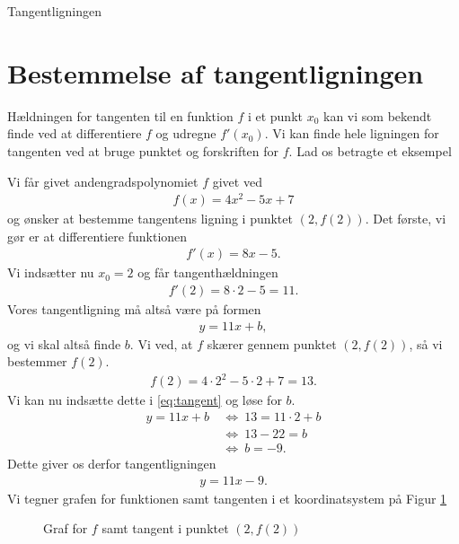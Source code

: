 \begin{center}
	\Huge
	Tangentligningen 
\end{center}

\section*{Bestemmelse af tangentligningen}

Hældningen for tangenten til en funktion $f$ i et punkt $x_0$ kan vi som bekendt finde ved at differentiere $f$
og udregne $f'(x_0)$. Vi kan finde hele ligningen for tangenten ved at bruge punktet og forskriften for $f$. Lad os betragte et eksempel
\begin{exa}
	Vi får givet andengradspolynomiet $f$ givet ved
	\begin{align*}
		f(x) = 4x^2-5x+7
	\end{align*}
	og ønsker at bestemme tangentens ligning i punktet $(2,f(2))$. Det første, vi gør er at differentiere 
	funktionen
	\begin{align*}
		f'(x) = 8x - 5.
	\end{align*}
	Vi indsætter nu $x_0 = 2$ og får tangenthældningen
	\begin{align*}
		f'(2) = 8\cdot 2 - 5 = 11.
	\end{align*}
	Vores tangentligning må altså være på formen
	\begin{align}\label{eq:tangent}
		y = 11x + b,
	\end{align}
	og vi skal altså finde $b$. Vi ved, at $f$ skærer gennem punktet $(2,f(2))$, så vi bestemmer $f(2)$.
	\begin{align*}
		f(2) = 4\cdot 2^2-5\cdot 2 + 7 = 13.
	\end{align*}
	Vi kan nu indsætte dette i \eqref{eq:tangent} og løse for $b$.
	\begin{align*}
		y = 11x + b \ &\Leftrightarrow \ 13 = 11\cdot 2 + b \\
		&\Leftrightarrow	 \ 13 - 22 = b \\
		&\Leftrightarrow	 \ b = -9.
	\end{align*}
	Dette giver os derfor tangentligningen 
	\begin{align*}
		y = 11x-9.
	\end{align*}
	Vi tegner grafen for funktionen samt tangenten i et koordinatsystem på Figur \ref{fig:tangent}
	\begin{figure}[H]
		\centering
		\caption{Graf for $f$ samt tangent i punktet $(2,f(2))$}
		\label{fig:tangent}
	\end{figure}
	\phantom{h}
\end{exa}

